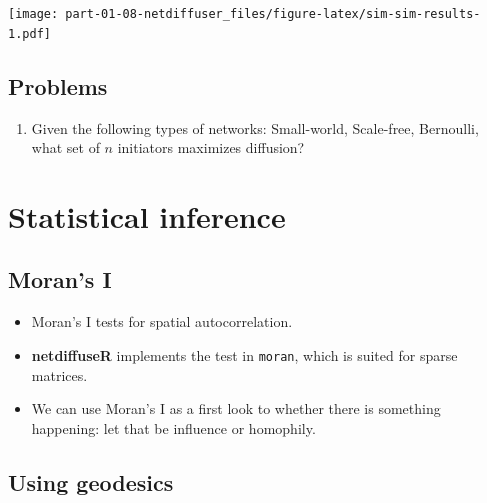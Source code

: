 \documentclass[]{book}
\providecommand{\tightlist}{%
  \setlength{\itemsep}{0pt}\setlength{\parskip}{0pt}}
\begin{document}
\texttt{[image: part-01-08-netdiffuser\_files/figure-latex/sim-sim-results-1.pdf]}

\hypertarget{problems-1}{%
\subsection{Problems}\label{problems-1}}

\begin{enumerate}
\def\labelenumi{\arabic{enumi}.}
\tightlist
\item
  Given the following types of networks: Small-world, Scale-free, Bernoulli,
  what set of \(n\) initiators maximizes diffusion?
\end{enumerate}

\hypertarget{statistical-inference}{%
\section{Statistical inference}\label{statistical-inference}}

\hypertarget{morans-i}{%
\subsection{Moran's I}\label{morans-i}}

\begin{itemize}
\item
  Moran's I tests for spatial autocorrelation.
\item
  \textbf{netdiffuseR} implements the test in \texttt{moran}, which is suited for sparse matrices.
\item
  We can use Moran's I as a first look to whether there is something happening:
  let that be influence or homophily.
\end{itemize}

\hypertarget{using-geodesics}{%
\subsection{Using geodesics}\label{using-geodesics}}
\end{document}
